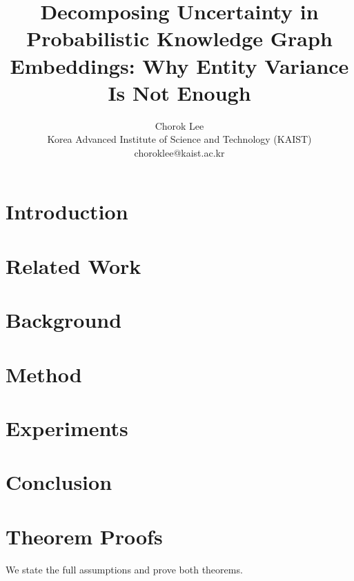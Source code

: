 \documentclass[accepted]{uai2024}  %
\title{Decomposing Uncertainty in Probabilistic Knowledge Graph Embeddings: Why Entity Variance Is Not Enough}
\author{
  Chorok Lee \\
  Korea Advanced Institute of Science and Technology (KAIST) \\
  choroklee@kaist.ac.kr
}
\begin{document}
\maketitle

\begin{abstract}

\end{abstract}

\section{Introduction}
\label{sec:intro}


\section{Related Work}
\label{sec:related}


\section{Background}
\label{sec:background}


\section{Method}
\label{sec:method}


\section{Experiments}
\label{sec:experiments}


\section{Conclusion}
\label{sec:conclusion}




\appendix

\section{Theorem Proofs}
\label{app:proof}

We state the full assumptions and prove both theorems.
\end{document}
